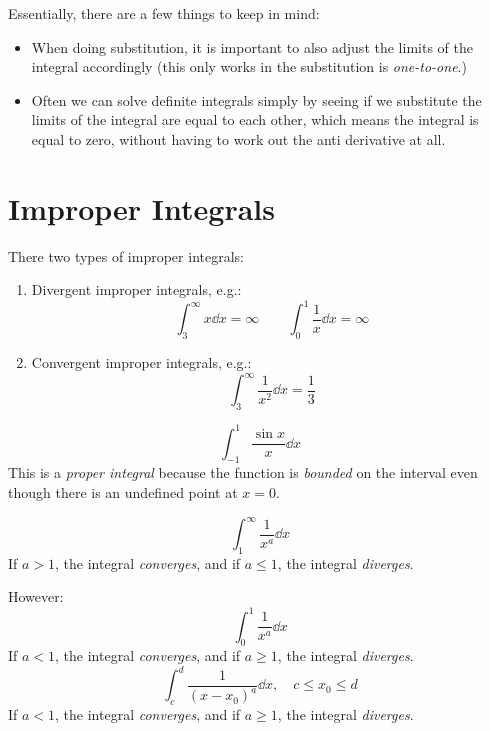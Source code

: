 \documentclass[00_complete]{subfiles}
\begin{document}
Essentially, there are a few things to keep in mind:
\begin{itemize}
    \item When doing substitution, it is important to also adjust the limits of
        the integral accordingly (this only works in the substitution is
        \emph{one-to-one}.)
    \item Often we can solve definite integrals simply by seeing if we
        substitute the limits of the integral are equal to each other, which
        means the integral is equal to zero, without having to work out the
        anti derivative at all.
\end{itemize}
\section{Improper Integrals}
There two types of improper integrals:
\begin{enumerate}
    \item Divergent improper integrals, e.g.:
        $$\int_{3}^{\infty}x\dd{x}=\infty \qquad
        \int_{0}^{1}\frac{1}{x}\dd{x}=\infty$$
    \item Convergent improper integrals, e.g.:
        $$\int_{3}^{\infty}\frac{1}{x^2}\dd{x}=\frac{1}{3}$$
\end{enumerate}
\begin{note}
    $$\int_{-1}^{1}\frac{\sin x}{x}\dd{x}$$
    This is a \emph{proper integral} because the function is \emph{bounded} on
    the interval even though there is an undefined point at $x=0$.
\end{note}
\begin{theorem}
$$\int_{1}^{\infty}\frac{1}{x^a}\dd{x}$$
If $a>1$, the integral \emph{converges}, and if $a\leq 1$, the integral
\emph{diverges}.

However:
$$\int_{0}^{1}\frac{1}{x^a}\dd{x}$$
If $a<1$, the integral \emph{converges}, and if $a\geq 1$, the integral
\emph{diverges}.
$$\int_{c}^{d}\frac{1}{(x-x_0)^a}\dd{x}, \quad c \leq x_0\leq d$$
If $a<1$, the integral \emph{converges}, and if $a\geq 1$, the integral
\emph{diverges}.
\end{theorem}
\end{document}
